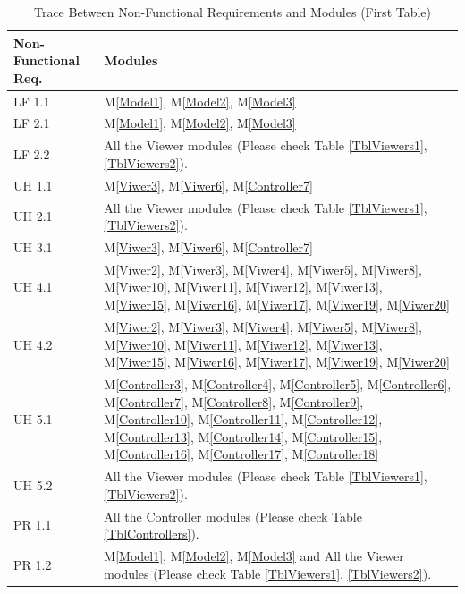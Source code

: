 \documentclass[12pt, titlepage]{article}
\newcommand{\mref}[1]{M\ref{#1}}
\begin{document}
\newcommand{\ALLMM}{All the Model modules (Please check Table \ref{TblModels}).}

\newcommand{\ALLVM}{All the Viewer modules (Please check Table \ref{TblViewers1},
 \ref{TblViewers2}).}
 
\newcommand{\ALLCM}{All the Controller modules (Please check Table \ref{TblControllers}).}

\begin{table}[H]
\caption{Trace Between Non-Functional Requirements and Modules (First Table)}
\label{TbNFRM1}

\centering
\begin{tabular}{p{} p{}}
\toprule
\textbf{Non-Functional Req.} & \textbf{Modules}\\
\midrule
LF 1.1 & \mref{Model1}, \mref{Model2}, \mref{Model3}\\
LF 2.1 & \mref{Model1}, \mref{Model2}, \mref{Model3}\\
LF 2.2 & \ALLVM \\
UH 1.1 & \mref{Viwer3}, \mref{Viwer6}, \mref{Controller7}\\
UH 2.1 & \ALLVM \\
UH 3.1 & \mref{Viwer3}, \mref{Viwer6}, \mref{Controller7}\\
UH 4.1 & \mref{Viwer2}, \mref{Viwer3}, \mref{Viwer4}, \mref{Viwer5}, \mref{Viwer8}, 
\mref{Viwer10}, \mref{Viwer11}, \mref{Viwer12}, \mref{Viwer13}, \mref{Viwer15}, 
\mref{Viwer16}, \mref{Viwer17}, \mref{Viwer19}, \mref{Viwer20}\\
UH 4.2 & \mref{Viwer2}, \mref{Viwer3}, \mref{Viwer4}, \mref{Viwer5}, \mref{Viwer8}, 
\mref{Viwer10}, \mref{Viwer11}, \mref{Viwer12}, \mref{Viwer13}, \mref{Viwer15}, 
\mref{Viwer16}, \mref{Viwer17}, \mref{Viwer19}, \mref{Viwer20}\\

UH 5.1 & \mref{Controller3}, \mref{Controller4}, \mref{Controller5}, \mref{Controller6}, 
\mref{Controller7}, \mref{Controller8}, \mref{Controller9}, \mref{Controller10}, 
\mref{Controller11}, \mref{Controller12}, \mref{Controller13}, \mref{Controller14}, 
\mref{Controller15}, \mref{Controller16}, \mref{Controller17}, \mref{Controller18}\\

UH 5.2 & \ALLVM \\

PR 1.1 & \ALLCM \\

PR 1.2 & \mref{Model1}, \mref{Model2}, \mref{Model3} and \ALLVM \\


\end{tabular}
\end{table}
\end{document}
